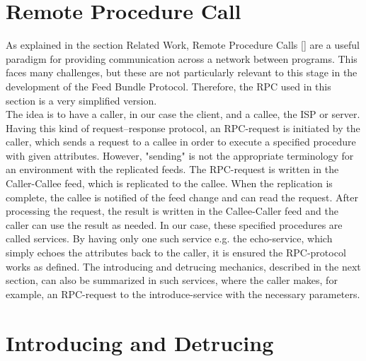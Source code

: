 \section{Remote Procedure Call}
As explained in the section Related Work, Remote Procedure Calls [] are a useful paradigm for providing communication across a
network between programs. This faces many challenges, but these are not particularly relevant to this stage in the development of the Feed Bundle Protocol. Therefore, the RPC used in this section is a very simplified version.\\
The idea is to have a caller, in our case the client, and a callee, the ISP or server. Having this kind of request–response protocol, an RPC-request is initiated by the caller, which sends a request to a callee in order to execute a specified procedure with given attributes. However, "sending" is not the appropriate terminology for an environment with the replicated feeds. The RPC-request is written in the Caller-Callee feed, which is replicated to the callee. When the replication is complete, the callee is notified of the feed change and can read the request. After processing the request, the result is written in the Callee-Caller feed and the caller can use the result as needed. In our case, these specified procedures are called services. By having only one such service e.g. the echo-service, which simply echoes the attributes back to the caller, it is ensured the RPC-protocol works as defined. The introducing and detrucing mechanics, described in the next section, can also be summarized in such services, where the caller makes, for example, an RPC-request to the introduce-service with the necessary parameters. 

\section{Introducing and Detrucing}
